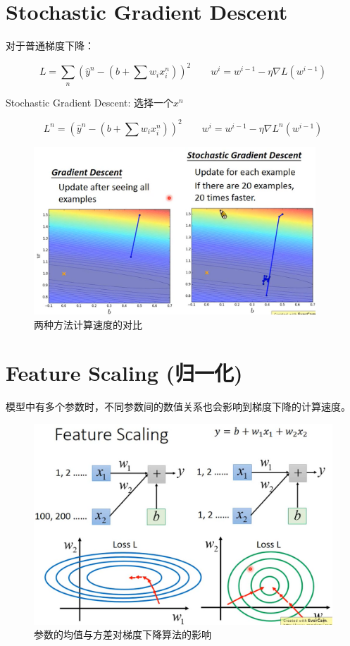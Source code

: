 \documentclass[UTF8,a4paper]{article}
\begin{document}
\section{Stochastic Gradient Descent}

对于普通梯度下降：

\[L=\sum_n \left(\hat{y}^n-\left(b+\sum w_i x_i^n\right)\right)^2\qquad w^i=w^{i-1}-\eta\nabla L(w^{i-1})\]

Stochastic Gradient Descent: 选择一个$x^n$

\begin{equation}
L^n=\left(\hat{y}^n-\left(b+\sum w_i x_i^n\right)\right)^2 \qquad w^i=w^{i-1}-\eta\nabla L^n(w^{i-1})
\end{equation}

\begin{figure}[ht]
\centering
\includegraphics[width=300pt]{stochasticGradientDescent.png}
\caption{两种方法计算速度的对比}
\label{stochastic}
\end{figure}

\section{Feature Scaling (归一化)}

模型中有多个参数时，不同参数间的数值关系也会影响到梯度下降的计算速度。

\newpage

\begin{figure}[ht]
\centering
\includegraphics[width=340pt]{featureScaling.png}
\caption{参数的均值与方差对梯度下降算法的影响}
\label{featureScaling}
\end{figure}
\end{document}
